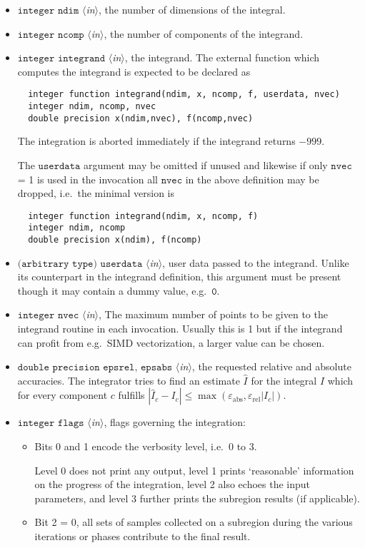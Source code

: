 \documentclass[12pt]{article}
\newcommand\ie{i.e.\ }
\newcommand\eg{e.g.\ }
\newcommand\epsabs{\varepsilon_{\text{abs}}}
\newcommand\epsrel{\varepsilon_{\text{rel}}}
\newcommand\Code[1]{\ensuremath{\texttt{#1}}}
\newcommand\VarIn[1]{\item\Code{#1} \textit{$\langle$in\/$\rangle$},}
\begin{document}
\begin{itemize}
\VarIn{integer ndim}
the number of dimensions of the integral.

\VarIn{integer ncomp}
the number of components of the integrand.

\VarIn{integer integrand}
the integrand.  The external function which computes the 
integrand is expected to be declared as
\begin{verbatim}
  integer function integrand(ndim, x, ncomp, f, userdata, nvec)
  integer ndim, ncomp, nvec
  double precision x(ndim,nvec), f(ncomp,nvec)
\end{verbatim}
The integration is aborted immediately if the integrand returns $-999$.  

The \Code{userdata} argument may be omitted if unused and likewise
if only \Code{nvec} = 1 is used in the invocation all \Code{nvec}
in the above definition may be dropped, \ie the minimal version is
\begin{verbatim}
  integer function integrand(ndim, x, ncomp, f)
  integer ndim, ncomp
  double precision x(ndim), f(ncomp)
\end{verbatim}

\VarIn{(arbitrary type) userdata}
user data passed to the integrand.  Unlike its counterpart in the
integrand definition, this argument must be present though it may
contain a dummy value, \eg \Code{0}.

\VarIn{integer nvec}
The maximum number of points to be given to the integrand
routine in each invocation.  Usually this is 1 but if the integrand
can profit from \eg SIMD vectorization, a larger value can be chosen.

\VarIn{double precision epsrel, epsabs}
the requested relative and absolute accuracies.
The integrator tries to find an estimate $\hat I$ for the integral $I$
which for every component $c$ fulfills $|\hat I_c - I_c|\leqslant
\max(\epsabs, \epsrel |I_c|)$.

\VarIn{integer flags}
flags governing the integration:
\begin{itemize}
\item Bits 0 and 1 encode the verbosity level, \ie 0 to 3.

Level 0 does not print any output, level 1 prints `reasonable'
information on the progress of the integration, level 2 also echoes the
input parameters, and level 3 further prints the subregion results (if
applicable).

\item Bit 2 = 0,
all sets of samples collected on a subregion during the various 
iterations or phases contribute to the final result.


\end{itemize}
\end{itemize}
\end{document}
